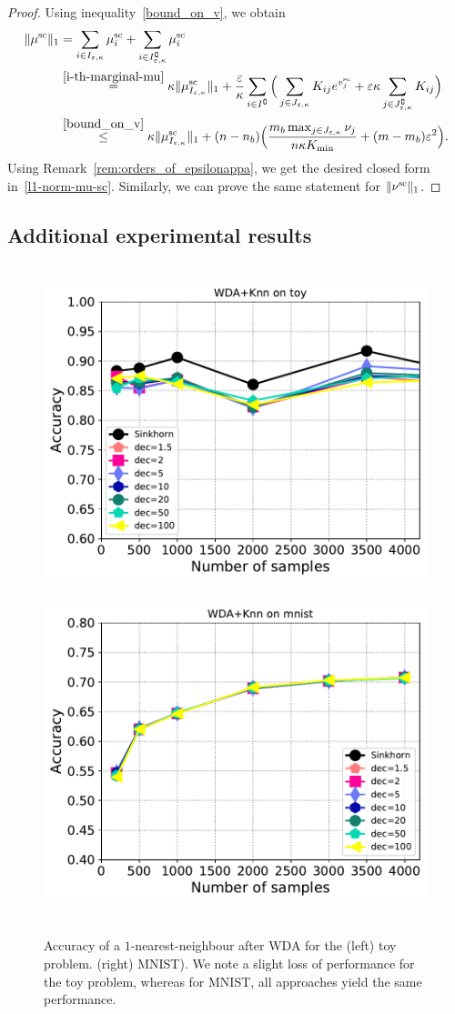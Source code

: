 \begin{proof}
Using inequality~\eqref{bound_on_v}, we obtain 
\begin{align*}
\|\mu^{\text{sc}}\|_1 &= \sum_{i \in I_{\varepsilon,\kappa}} \mu^{\text{sc}}_i +  \sum_{i \in I^\complement_{\varepsilon,\kappa}}\mu^{\text{sc}}_i\\
& \overset{\eqref{i-th-marginal-mu}}{=} \kappa \|\mu_{I_{\varepsilon,\kappa}}^{\text{sc}}\|_1 + \frac \varepsilon\kappa \sum_{i \in I^\complement}\Big( \sum_{j \in J_{\varepsilon,\kappa}} K_{ij} e^{v^{\text{sc}}_j} + \varepsilon\kappa \sum_{j\in J^\complement_{\varepsilon,\kappa}}K_{ij}\Big)\\
& \overset{\eqref{bound_on_v}}{\leq} \kappa \|\mu_{I_{\varepsilon,\kappa}}^{\text{sc}}\|_1 + (n-n_b) \Big(\frac{m_b\max_{j \in J_{\varepsilon,\kappa}} \nu_j}{n\kappa K_{\min}} + (m-m_b)\varepsilon^2 \Big).
\end{align*}
Using Remark~\ref{rem:orders_of_epsilonappa}, we get the desired closed form in~\eqref{l1-norm-mu-sc}.
Similarly, we can prove the same statement for $\|\nu^{\text{sc}}\|_1$.
\end{proof}

\subsection{Additional experimental results}

\begin{figure}[htbp]
	\centering
	~\hfill~\includegraphics[width=6.cm]{./figs/wda_accur_toy.pdf}~\hfill~
	\includegraphics[width=6.cm]{./figs/wda_accur_mnist.pdf}~\hfill~\\
	\caption{Accuracy of a $1$-nearest-neighbour after WDA for the (left) toy problem.
		(right) MNIST). We note a slight loss of performance for the toy problem, whereas for MNIST, all approaches yield the same performance. 
		\label{fig:wda_gain}}
\end{figure}

